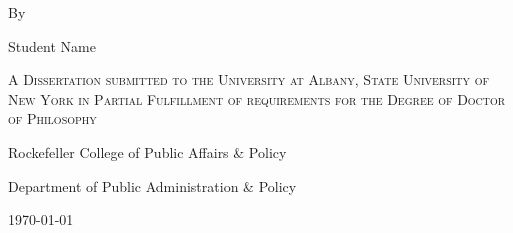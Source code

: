 \thispagestyle{empty}
\begin{titlepage}
	\centering
	
	{\LARGE \TheTitle \par}
	\vspace{1.5cm}
	
	{\large By \par}
	
	\vspace{2cm}
	{\Large Student Name \par}
	
    \vspace{2.5cm}
    {\scshape A Dissertation submitted to the University at Albany, State University of New York in Partial Fulfillment of requirements for the Degree of Doctor of Philosophy \par}
    
    \vspace{2cm}
    {Rockefeller College of Public Affairs \& Policy \par}
    \vspace{0.2cm}
    {Department of Public Administration \& Policy \par}

	\vfill
	{\large \today \par}
\end{titlepage}

